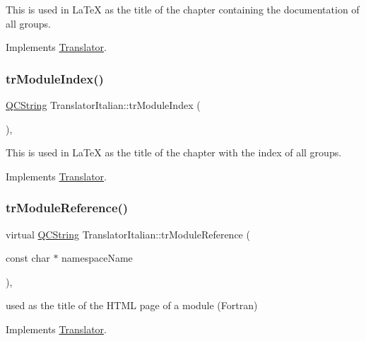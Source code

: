 This is used in La\+TeX as the title of the chapter containing the documentation of all groups. 

Implements \mbox{\hyperlink{class_translator}{Translator}}.

\mbox{\label{class_translator_italian_ad75cbe5e77bf89cbea9f2363363d72f7}} 
\subsubsection{\texorpdfstring{trModuleIndex()}{trModuleIndex()}}
{\footnotesize\ttfamily \mbox{\hyperlink{class_q_c_string}{Q\+C\+String}} Translator\+Italian\+::tr\+Module\+Index (\begin{DoxyParamCaption}{ }\end{DoxyParamCaption})\hspace{0.3cm}{\ttfamily [inline]}, {\ttfamily [virtual]}}

This is used in La\+TeX as the title of the chapter with the index of all groups. 

Implements \mbox{\hyperlink{class_translator}{Translator}}.

\mbox{\label{class_translator_italian_a9de630219d2bc82a336a09e6a9bcf055}} 
\subsubsection{\texorpdfstring{trModuleReference()}{trModuleReference()}}
{\footnotesize\ttfamily virtual \mbox{\hyperlink{class_q_c_string}{Q\+C\+String}} Translator\+Italian\+::tr\+Module\+Reference (\begin{DoxyParamCaption}\item[{const char $\ast$}]{namespace\+Name }\end{DoxyParamCaption})\hspace{0.3cm}{\ttfamily [inline]}, {\ttfamily [virtual]}}

used as the title of the H\+T\+ML page of a module (Fortran) 

Implements \mbox{\hyperlink{class_translator}{Translator}}.

